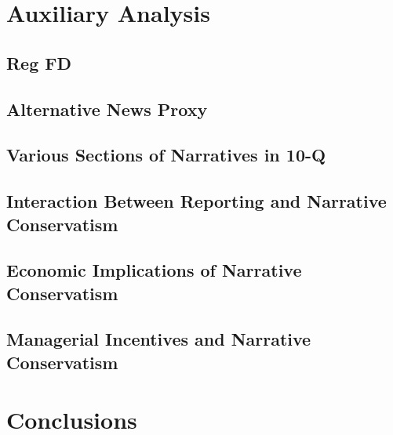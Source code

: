 \documentclass[a4paper]{article}
\begin{document}
\begin{spacing}{2}
\section{Auxiliary Analysis}

\subsection{Reg FD}

\subsection{Alternative News Proxy}

\subsection{Various Sections of Narratives in 10-Q}

\subsection{Interaction Between Reporting and Narrative Conservatism}

\subsection{Economic Implications of Narrative Conservatism}

\subsection{Managerial Incentives and Narrative Conservatism}

\section{Conclusions}

\end{spacing}

\newpage



\newpage


\newpage


\newpage


\newpage
\setcounter{page}{1}

\end{document}
